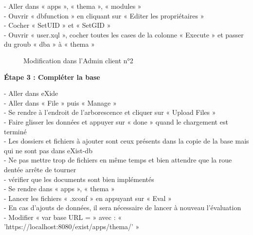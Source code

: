 \begin{flushleft}	
	- Aller dans « apps », « thema », « modules » \\
	- Ouvrir « dbfunction » en cliquant sur « Editer les propriétaires » \\
	- Cocher « SetUID » et « SetGID » \\ 
	- Ouvrir « user.xql », cocher toutes les cases de la colonne « Execute » et passer du groub « dba » à « thema » \\

\end{flushleft}	
	
\begin{figure}[H]
	\centering
	\caption{Modification dans l'Admin client n°2}
\end{figure}
	
\textbf{Étape 3 : Compléter la base} 

\begin{flushleft}	
	- Aller dans eXide \\ 
	- Aller dans « File » puis « Manage » \\
	- Se rendre à l'endroit de l'arborescence et cliquer sur « Upload Files » \\ 
	- Faire glisser les données et appuyer sur « done » quand le chargement est terminé \\
	- Les dossiers et fichiers à ajouter sont ceux présents dans la copie de la base mais qui ne sont pas dans eXist-db \\
	- Ne pas mettre trop de fichiers en même temps et bien attendre que la roue dentée arrête de tourner \\
	- vérifier que les documents sont bien implémentés \\
	
	 - Se rendre dans « apps », « thema » \\
	 - Lancer les fichiers « .xconf » en appuyant sur « Eval » \\
	 - En cas d'ajouts de données, il sera nécessaire de lancer à nouveau l'évaluation \\ 
	 - Modifier « var base URL = » avec : « 'https://localhost:8080/exist/apps/thema/' » \\
\end{flushleft}
	
